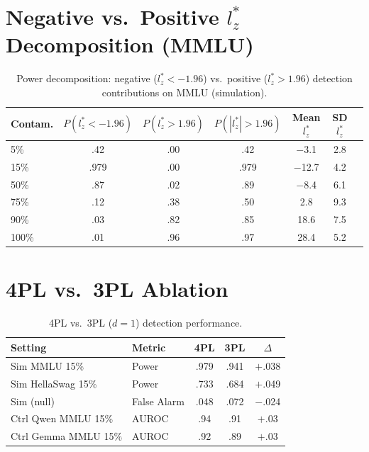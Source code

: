 \documentclass[11pt,a4paper]{article}
\begin{document}
\appendix

\section{Negative vs.\ Positive $l_z^*$ Decomposition (MMLU)}
\label{app:decomposition}

\begin{table}[h]
\centering
\small
\caption{Power decomposition: negative ($l_z^* < -1.96$) vs.\ positive ($l_z^* > 1.96$) detection contributions on MMLU (simulation).}
\label{tab:lz-decomposition}
\begin{tabular}{lcccccc}
\toprule
\textbf{Contam.} & $P(l_z^*{<}{-}1.96)$ & $P(l_z^*{>}1.96)$ & $P(|l_z^*|{>}1.96)$ & \textbf{Mean} $l_z^*$ & \textbf{SD} $l_z^*$ \\
\midrule
5\% & .42 & .00 & .42 & $-$3.1 & 2.8 \\
15\% & .979 & .00 & .979 & $-$12.7 & 4.2 \\
50\% & .87 & .02 & .89 & $-$8.4 & 6.1 \\
75\% & .12 & .38 & .50 & 2.8 & 9.3 \\
90\% & .03 & .82 & .85 & 18.6 & 7.5 \\
100\% & .01 & .96 & .97 & 28.4 & 5.2 \\
\bottomrule
\end{tabular}
\end{table}

\section{4PL vs.\ 3PL Ablation}
\label{app:4pl-ablation}

\begin{table}[h]
\centering
\small
\caption{4PL vs.\ 3PL ($d{=}1$) detection performance.}
\label{tab:4pl-ablation}
\begin{tabular}{llccc}
\toprule
\textbf{Setting} & \textbf{Metric} & \textbf{4PL} & \textbf{3PL} & $\Delta$ \\
\midrule
Sim MMLU 15\% & Power & .979 & .941 & $+$.038 \\
Sim HellaSwag 15\% & Power & .733 & .684 & $+$.049 \\
Sim (null) & False Alarm & .048 & .072 & $-$.024 \\
Ctrl Qwen MMLU 15\% & AUROC & .94 & .91 & $+$.03 \\
Ctrl Gemma MMLU 15\% & AUROC & .92 & .89 & $+$.03 \\
\bottomrule
\end{tabular}
\end{table}
\end{document}
